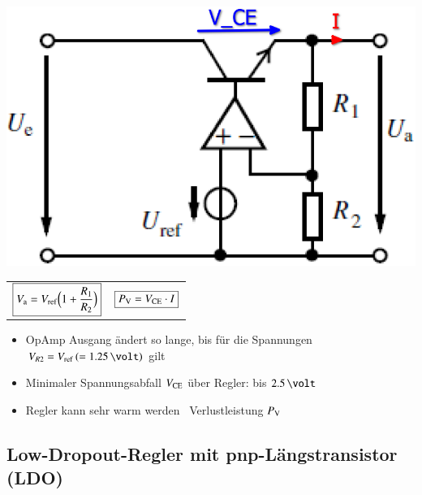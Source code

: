 \begin{minipage}[c]{0.3\columnwidth}
    \includegraphics[width=\columnwidth]{images/linearer_spannungsregler.png}
\end{minipage}
\hfill
\begin{minipage}[c]{0.68\columnwidth}
    \begin{tabular}{c c}
        $ \boxed{ V_{\rm a} = V_{\rm ref} \Big( 1 + \frac{R_1}{R_2} \Big) } $ & $ \boxed{ P_{\rm V} = V_{\rm CE} \cdot I} $
    \end{tabular}
    \begin{itemize}
        \item OpAmp Ausgang ändert so lange, bis für die Spannungen $V_{R2} = V_{\rm ref} \, (=1.25 \, \volt)$ gilt
        \item Minimaler Spannungsabfall $V_{\rm CE}$ über Regler: bis $2.5 \, \volt$
        \item Regler kann sehr warm werden \textrightarrow\ Verlustleistung $P_{\rm V}$
    \end{itemize}
\end{minipage}


\subsection{Low-Dropout-Regler mit pnp-Längstransistor (LDO)}

